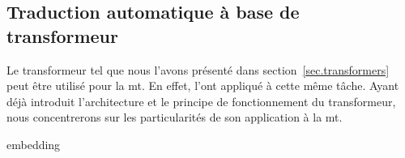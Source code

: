 \subsection{Traduction automatique à base de transformeur}
\label{subsec.nmt-transformer}

Le transformeur tel que nous l'avons présenté dans section~\ref{sec.transformers}
peut être utilisé pour la \gls{mt}.
En effet, \cite{attention} l'ont appliqué à cette même tâche.
Ayant déjà introduit l'architecture et le principe de fonctionnement du transformeur,
nous concentrerons sur les particularités de son application à la \gls{mt}.

{embedding}